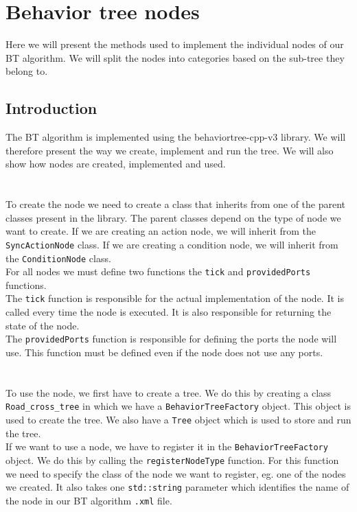 \section{Behavior tree nodes}
    Here we will present the methods used to implement the individual nodes of our BT algorithm. We will split the nodes into categories based on the sub-tree they belong to.
    \subsection{Introduction}
        The BT algorithm is implemented using the behaviortree-cpp-v3 library. We will therefore present the way we create, implement and run the tree. We will also show how nodes are created, implemented and used.\\\\
        \\
            To create the node we need to create a class that inherits from one of the parent classes present in the library. The parent classes depend on the type of node we want to create. If we are creating an action node, we will inherit from the \texttt{SyncActionNode} class. If we are creating a condition node, we will inherit from the \texttt{ConditionNode} class.\\
            For all nodes we must define two functions the \texttt{tick} and \texttt{providedPorts} functions.\\
            The \texttt{tick} function is responsible for the actual implementation of the node. It is called every time the node is executed. It is also responsible for returning the state of the node.\\
            The \texttt{providedPorts} function is responsible for defining the ports the node will use. This function must be defined even if the node does not use any ports.\\\\
        \\
            To use the node, we first have to create a tree. We do this by creating a class \texttt{Road\_cross\_tree} in which we have a \texttt{BehaviorTreeFactory} object. This object is used to create the tree. We also have a \texttt{Tree} object which is used to store and run the tree.\\
            If we want to use a node, we have to register it in the \texttt{BehaviorTreeFactory} object. We do this by calling the \texttt{registerNodeType} function. For this function we need to specify the class of the node we want to register, eg. one of the nodes we created. It also takes one \texttt{std::string} parameter which identifies the name of the node in our BT algorithm \texttt{.xml} file.\\\\
